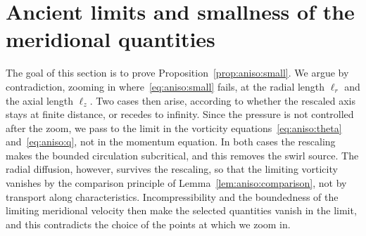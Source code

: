 \documentclass[11pt,reqno]{amsproc}
\numberwithin{equation}{section}
\theoremstyle{remark}
\begin{document}
\section{Ancient limits and smallness of the meridional quantities}
\label{sec:aniso:zoom}
The goal of this section is to prove Proposition~\ref{prop:aniso:small}. We argue by contradiction, zooming in where~\eqref{eq:aniso:small} fails, at the radial length $\ell_r$ and the axial length $\ell_z$. Two cases then arise, according to whether the rescaled axis stays at finite distance, or recedes to infinity. Since the pressure is not controlled after the zoom, we pass to the limit in the vorticity equations~\eqref{eq:aniso:theta} and~\eqref{eq:aniso:q}, not in the momentum equation. In both cases the rescaling makes the bounded circulation subcritical, and this removes the swirl source. The radial diffusion, however, survives the rescaling, so that the limiting vorticity vanishes by the comparison principle of Lemma~\ref{lem:aniso:comparison}, not by transport along characteristics. Incompressibility and the boundedness of the limiting meridional velocity then make the selected quantities vanish in the limit, and this contradicts the choice of the points at which we zoom in.
\end{document}
